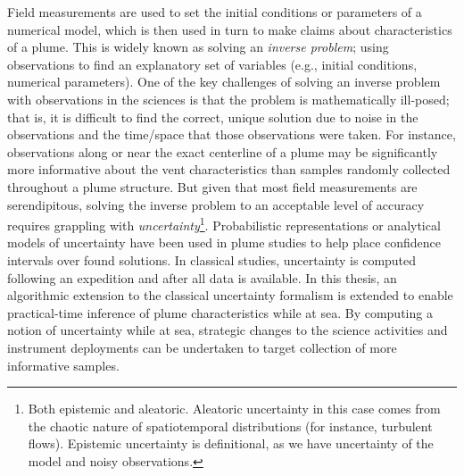Field measurements are used to set the initial conditions or parameters of a numerical model, which is then used in turn to make claims about characteristics of a plume.
This is widely known as solving an \emph{inverse problem}; using observations to find an explanatory set of variables (e.g., initial conditions, numerical parameters).
One of the key challenges of solving an inverse problem with observations in the sciences is that the problem is mathematically ill-posed; that is, it is difficult to find the correct, unique solution due to noise in the observations and the time/space that those observations were taken.
For instance, observations along or near the exact centerline of a plume may be significantly more informative about the vent characteristics\autocite{bangian2022solution} than samples randomly collected throughout a plume structure\autocite{baker1998rise}.
But given that most field measurements are serendipitous, solving the inverse problem to an acceptable level of accuracy requires grappling with \emph{uncertainty}\footnote{Both epistemic and aleatoric. Aleatoric uncertainty in this case comes from the chaotic nature of spatiotemporal distributions (for instance, turbulent flows). Epistemic uncertainty is definitional, as we have uncertainty of the model and noisy observations.}.
Probabilistic representations or analytical models of uncertainty have been used in plume studies to help place confidence intervals over found solutions\autocite{bemis1993geothermal,sohn2019observations}.
In classical studies, uncertainty is computed following an expedition and after all data is available.
In this thesis, an algorithmic extension to the classical uncertainty formalism is extended to enable practical-time inference of plume characteristics while at sea.
By computing a notion of uncertainty while at sea, strategic changes to the science activities and instrument deployments can be undertaken to target collection of more informative samples.





